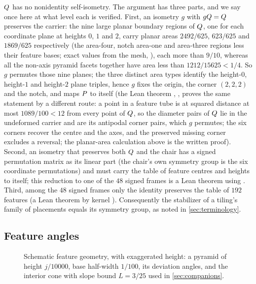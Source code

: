 $Q$ has no nonidentity self-isometry. The argument has three parts, and we say once here at what level
each is verified. First, an isometry $g$ with $gQ=Q$ preserves the carrier: the nine
large planar boundary regions of $Q$, one for each coordinate plane at heights $0$, $1$ and
$2$, carry planar areas $2492/625$, $623/625$ and $1869/625$ respectively (the area-four, notch
area-one and area-three regions less their feature bases; exact values from the mesh,
), each more than $9/10$, whereas all the non-axis pyramid
facets together have area less than $1212/15625<1/4$. So $g$ permutes those nine planes; the
three distinct area types identify the height-$0$, height-$1$ and height-$2$ plane triples, hence
$g$ fixes the origin, the corner $(2,2,2)$ and the notch, and maps $P$ to itself
(the Lean theorem , , proves the same
statement by a different route: a point in a feature tube is at squared distance at most
$1089/100<12$ from every point of $Q$, so the diameter pairs of $Q$ lie in the
undeformed carrier and are its antipodal corner pairs, which $g$ permutes; the six corners
recover the centre and the axes, and the preserved missing corner excludes a reversal; the
planar-area calculation above is the written proof). Second, an isometry that preserves both $Q$
and the chair has a signed permutation matrix as its linear part (the chair's own symmetry group
is the six coordinate permutations) and must carry the table of feature centres and heights to
itself; this reduction to one of the $48$ signed frames is a Lean theorem using
. Third, among the $48$ signed frames only the identity preserves the
table of $192$ features (a Lean theorem by kernel ). Consequently the stabilizer of
a tiling's family of placements equals its symmetry group, as noted in \cref{sec:terminology}.

\subsection{Feature angles}\label{app:angles}

\begin{figure}[ht]
  \centering
  \resizebox{\linewidth}{!}{}
  \caption{Schematic feature geometry, with exaggerated height: a pyramid of height $j/10000$,
  base half-width $1/100$, its deviation angles, and the interior cone with slope bound $L=3/25$
  used in \cref{sec:companions}.}
  \label{fig:feature}
\end{figure}

